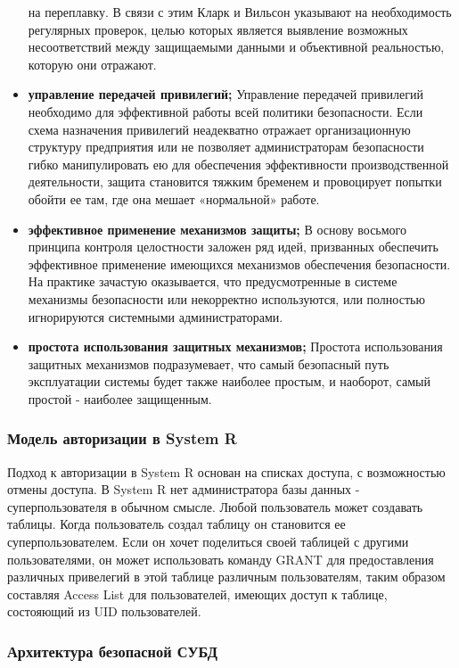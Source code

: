 \begin{itemize}
    на переплавку. В связи с этим Кларк и Вильсон указывают на необходимость регулярных проверок,
    целью которых является выявление возможных несоответствий между защищаемыми данными и объективной
    реальностью, которую они отражают.
    \item \textbf{управление передачей привилегий;}
    Управление передачей привилегий необходимо для эффективной работы всей политики безопасности.
    Если схема назначения привилегий неадекватно отражает организационную структуру предприятия или
    не позволяет администраторам безопасности гибко манипулировать ею для обеспечения эффективности
    производственной деятельности, защита становится тяжким бременем и провоцирует попытки обойти ее
    там, где она мешает «нормальной» работе.
    \item \textbf{эффективное применение механизмов защиты;}
    В основу восьмого принципа контроля целостности заложен ряд идей, призванных обеспечить эффективное
    применение имеющихся механизмов обеспечения безопасности. На практике зачастую оказывается, что
    предусмотренные в системе механизмы безопасности или некорректно используются, или полностью
    игнорируются системными администраторами.
    \item \textbf{простота использования защитных механизмов;}
    Простота использования защитных механизмов подразумевает, что самый безопасный путь эксплуатации системы
    будет также наиболее простым, и наоборот, самый простой - наиболее защищенным.
\end{itemize}

\subsubsection{Модель авторизации в System R}
Подход к авторизации в System R основан на списках доступа, с возможностью отмены доступа.
В System R нет администратора базы данных - суперпользователя в обычном смысле. Любой пользователь может создавать таблицы.
Когда пользователь создал таблицу он становится ее суперпользователем.
Если он хочет поделиться своей таблицей с другими пользователями, он может использовать команду GRANT для
предоставления различных привелегий в этой таблице различным пользователям, таким образом составляя
Access List для пользователей, имеющих доступ к таблице, состояющий из UID пользователей.

\subsubsection{Архитектура безопасной СУБД}

